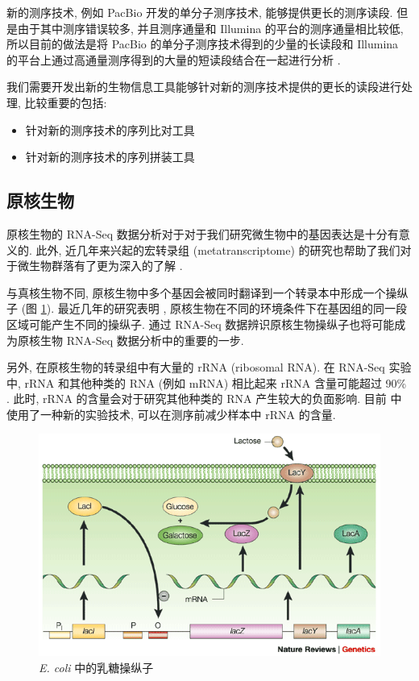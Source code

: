 新的测序技术, 例如 PacBio 开发的单分子测序技术, 能够提供更长的测序读段. 
但是由于其中测序错误较多, 并且测序通量和 Illumina 的平台的测序通量相比较低, 
所以目前的做法是将 PacBio 的单分子测序技术得到的少量的长读段和 Illumina 
的平台上通过高通量测序得到的大量的短读段结合在一起进行分析 \cite{hybrid.rna.seq.2012}. 

我们需要开发出新的生物信息工具能够针对新的测序技术提供的更长的读段进行处理, 
比较重要的包括: 
\begin{itemize}
\item 针对新的测序技术的序列比对工具

\item 针对新的测序技术的序列拼装工具
\end{itemize}

\subsection{原核生物}
原核生物的 RNA-Seq 数据分析对于对于我们研究微生物中的基因表达是十分有意义的. 
此外, 近几年来兴起的宏转录组 (metatranscriptome) 的研究也帮助了我们对于微生物群落有了更为深入的了解
\cite{gilbert2008detection, urich2008simultaneous, gifford2010quantitative, 
helbling2011activity, mason2012metagenome, huson2011integrative, 
lesniewski2012metatranscriptome}. 

\nocite{sorek2009prokaryotic}

与真核生物不同, 原核生物中多个基因会被同时翻译到一个转录本中形成一个操纵子 
(图 \ref{e.coli.lactose.operon}). 
最近几年的研究表明 \cite{MarcGuell11272009, koide2009prevalence}, 
原核生物在不同的环境条件下在基因组的同一段区域可能产生不同的操纵子. 
通过 RNA-Seq 数据辨识原核生物操纵子也将可能成为原核生物 RNA-Seq 数据分析中的重要的一步. 

另外, 在原核生物的转录组中有大量的 rRNA (ribosomal RNA).  
在 RNA-Seq 实验中, 
rRNA 和其他种类的 RNA (例如 mRNA) 相比起来 rRNA 含量可能超过 
90\% \cite{giannoukos2012efficient}. 
此时, rRNA 的含量会对于研究其他种类的 RNA 产生较大的负面影响. 
目前  中使用了一种新的实验技术, 
可以在测序前减少样本中 rRNA 的含量. 

\begin{figure}[!t]
\centering
\includegraphics[width=\textwidth]{figures/disc/e-coli-lactose-operon.png}
\caption{\textit{E. coli} 中的乳糖操纵子 \cite{shuman2003art}}
\label{e.coli.lactose.operon}
\end{figure}










